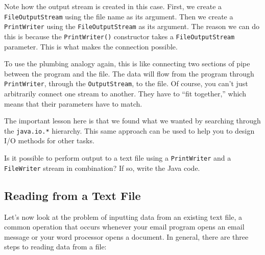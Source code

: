 \noindent Note how the output stream is created in this case.  First,
we create a {\tt FileOutputStream} using the file name as its
argument.  Then we create a {\tt PrintWriter} using the
{\tt FileOutputStream} as its argument.  The reason we can do this is
because the {\tt PrintWriter()} constructor takes a
{\tt FileOutputStream} parameter.  This is what makes the connection
possible.


To use the plumbing analogy again, this is like connecting two
sections of pipe between the program and the file.
The data will flow from the program through {\tt PrintWriter}, through
the {\tt OutputStream}, to the file.  Of course, you can't just
arbitrarily connect one stream to another.  They have to ``fit
together,'' which means that their parameters have to match.

\WWWjava

\noindent The important lesson here is that we found what we wanted by searching
through the {\tt java.io.*} hierarchy.  This same approach can be used
to help you to design I/O methods for other tasks.

\label{self-study-exercise}
\begin{SSTUDY}
\item  Is it possible to perform output to a text file using a
{\tt PrintWriter} and a {\tt FileWriter} stream in combination? If so,
write the Java code.
\end{SSTUDY}

\subsection{Reading from a Text File}
\noindent Let's now look at the problem of inputting data from an
existing text file, a common operation that occurs whenever your email
program opens an email message or your word processor opens a
document.  In general, there are three steps to reading data from a
file:


